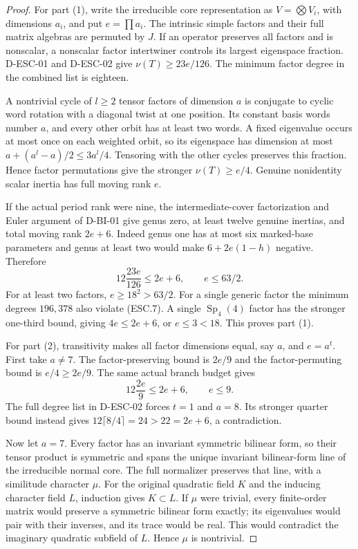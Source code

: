 \begin{proof}
For part (1), write the irreducible core representation as
$V=\bigotimes V_i$, with dimensions $a_i$, and put
$e=\prod a_i$.  The intrinsic simple factors and their full
matrix algebras are permuted by $J$.  If an operator preserves
all factors and is nonscalar, a nonscalar factor intertwiner
controls its largest eigenspace fraction.  D-ESC-01 and
D-ESC-02 give $\nu(T)\ge23e/126$.  The minimum factor degree
in the combined list is eighteen.

A nontrivial cycle of $l\ge2$ tensor factors of dimension
$a$ is conjugate to cyclic word rotation with a diagonal
twist at one position.  Its constant basis words number
$a$, and every other orbit has at least two words.  A fixed
eigenvalue occurs at most once on each weighted orbit, so
its eigenspace has dimension at most
$a+(a^l-a)/2\le3a^l/4$.  Tensoring with the other cycles
preserves this fraction.  Hence factor permutations give
the stronger $\nu(T)\ge e/4$.  Genuine nonidentity scalar
inertia has full moving rank $e$.

If the actual period rank were nine, the intermediate-cover
factorization and Euler argument of D-BI-01 give genus zero,
at least twelve genuine inertias, and total moving rank
$2e+6$.  Indeed genus one has at most six marked-base
parameters and genus at least two would make
$6+2e(1-h)$ negative.  Therefore
\[
                  12\frac{23e}{126}\le2e+6,
                        \qquad e\le63/2.                 \tag{ESC.7}
\]
For at least two factors, $e\ge18^2>63/2$.
For a single generic factor the minimum degrees $196,378$
also violate (ESC.7).  A single $\operatorname{Sp}_4(4)$
factor has the stronger one-third bound, giving
$4e\le2e+6$, or $e\le3<18$.  This proves part (1).

For part (2), transitivity makes all factor dimensions equal,
say $a$, and $e=a^t$.  First take $a\ne7$.
The factor-preserving bound is $2e/9$ and the factor-permuting
bound is $e/4\ge2e/9$.  The same actual branch budget gives
\[
                        12\frac{2e}{9}\le2e+6,
                              \qquad e\le9.               \tag{ESC.8}
\]
The full degree list in D-ESC-02 forces $t=1$ and $a=8$.
Its stronger quarter bound instead gives
$12\lceil8/4\rceil=24>22=2e+6$, a contradiction.

Now let $a=7$.  Every factor has an invariant symmetric
bilinear form, so their tensor product is symmetric and
spans the unique invariant bilinear-form line of the
irreducible normal core.  The full normalizer preserves
that line, with a similitude character $\mu$.
For the original quadratic field $K$ and the inducing
character field $L$, induction gives $K\subset L$.
If $\mu$ were trivial, every finite-order matrix would
preserve a symmetric bilinear form exactly; its eigenvalues
would pair with their inverses, and its trace would be real.
This would contradict the imaginary quadratic subfield of
$L$.  Hence $\mu$ is nontrivial.


\end{proof}
